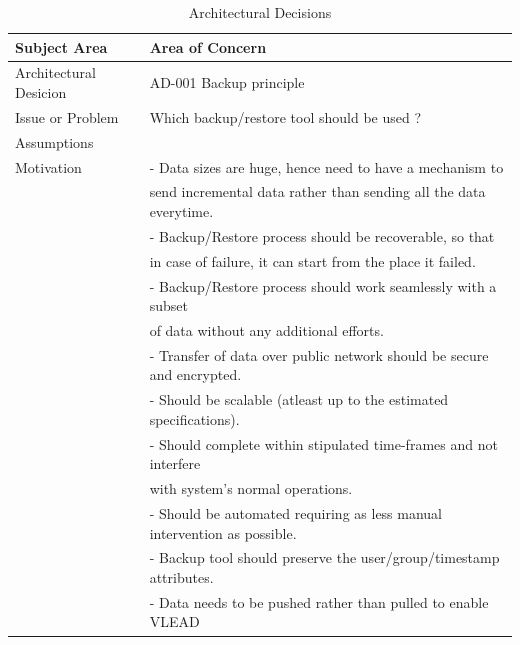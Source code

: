 \documentclass[11pt]{article}
\begin{document}
\begin{table}[H]
\caption{\label{tbl:Backup Principle}Architectural Decisions}
\begin{center}
\begin{tabular}{ll}
\hline
 Subject Area            &  Area of Concern                                                            \\
\hline
 Architectural Desicion  &  AD-001 Backup principle                                                    \\
 Issue or Problem        &  Which backup/restore tool should be used ?                                 \\
 Assumptions             &                                                                             \\
 Motivation              &  - Data sizes are huge, hence need to have a mechanism to                   \\
                         &  send incremental data rather than sending all the data everytime.          \\
                         &  - Backup/Restore process should be recoverable, so that                    \\
                         &  in case of failure, it can start from the place it failed.                 \\
                         &  - Backup/Restore process should work seamlessly with a subset              \\
                         &  of data without any additional efforts.                                    \\
                         &  - Transfer of data over public network should be secure and encrypted.     \\
                         &  - Should be scalable (atleast up to the estimated specifications).         \\
                         &  - Should complete within stipulated time-frames and not interfere          \\
                         &  with system's normal operations.                                           \\
                         &  - Should be automated requiring as less manual intervention as possible.   \\
                         &  - Backup tool should preserve the user/group/timestamp attributes.         \\
                         &  - Data needs to be pushed rather than pulled to enable VLEAD               \\

\end{tabular}
\end{center}
\end{table}
\end{document}
